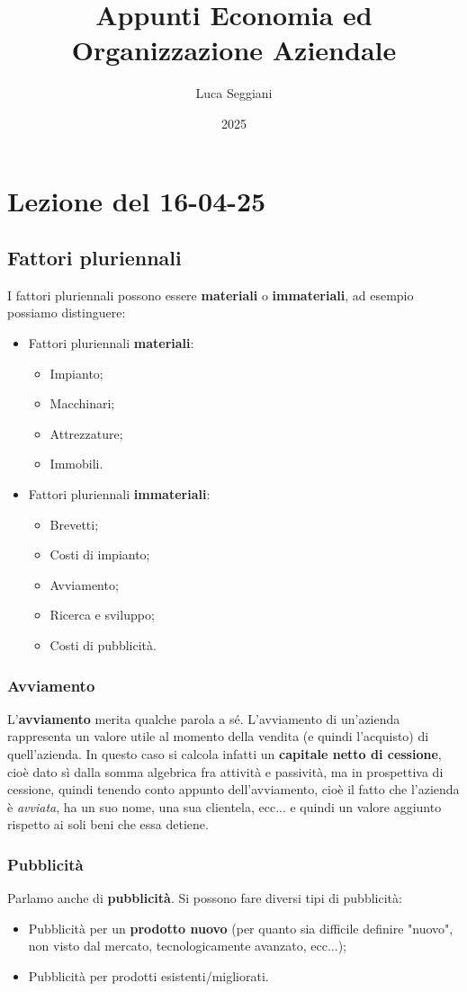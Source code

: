 \documentclass[a4paper,11pt]{article}
\title{Appunti Economia ed Organizzazione Aziendale}
\author{Luca Seggiani}
\date{2025}
\begin{document}
\section{Lezione del 16-04-25}

\thispagestyle{empty}
\pagestyle{fancy}

\subsection{Fattori pluriennali}
I fattori pluriennali possono essere \textbf{materiali} o \textbf{immateriali}, ad esempio possiamo distinguere:
\begin{itemize}
	\item Fattori pluriennali \textbf{materiali}:
		\begin{itemize}
			\item Impianto;
			\item Macchinari;
			\item Attrezzature;
			\item Immobili.
		\end{itemize}
	\item Fattori pluriennali \textbf{immateriali}:
		\begin{itemize}
			\item Brevetti;
			\item Costi di impianto;
			\item Avviamento;
			\item Ricerca e sviluppo;
			\item Costi di pubblicità.
		\end{itemize}
\end{itemize}

\subsubsection{Avviamento}
L'\textbf{avviamento} merita qualche parola a sé.
L'avviamento di un'azienda rappresenta un valore utile al momento della vendita (e quindi l'acquisto) di quell'azienda.
In questo caso si calcola infatti un \textbf{capitale netto di cessione}, cioè dato sì dalla somma algebrica fra attività e passività, ma in prospettiva di cessione, quindi tenendo conto appunto dell'avviamento, cioè il fatto che l'azienda è \textit{avviata}, ha un suo nome, una sua clientela, ecc... e quindi un valore aggiunto rispetto ai soli beni che essa detiene.

\subsubsection{Pubblicità}
Parlamo anche di \textbf{pubblicità}.
Si possono fare diversi tipi di pubblicità:
\begin{itemize}
	\item Pubblicità per un \textbf{prodotto nuovo} (per quanto sia difficile definire "nuovo", non visto dal mercato, tecnologicamente avanzato, ecc...);
	\item Pubblicità per prodotti esistenti/migliorati.
\end{itemize}
\end{document}
